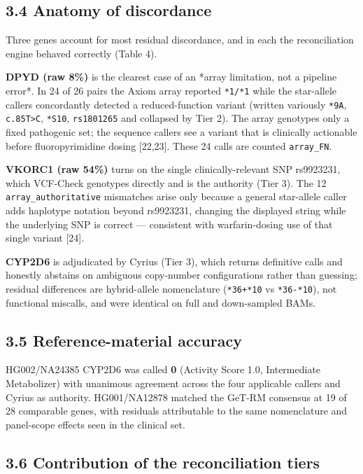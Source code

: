 \documentclass[11pt]{article}
\begin{document}
\subsection*{3.4 Anatomy of discordance}

Three genes account for most residual discordance, and in each the reconciliation engine behaved correctly (Table 4).

\textbf{DPYD (raw 8\%)} is the clearest case of an *array limitation, not a pipeline error*. In 24 of 26 pairs the Axiom array reported \texttt{*1/*1} while the star-allele callers concordantly detected a reduced-function variant (written variously \texttt{*9A}, \texttt{c.85T\textgreater{}C}, \texttt{*S10}, \texttt{rs1801265} and collapsed by Tier 2). The array genotypes only a fixed pathogenic set; the sequence callers see a variant that is clinically actionable before fluoropyrimidine dosing [22,23]. These 24 calls are counted \texttt{array\_FN}.

\textbf{VKORC1 (raw 54\%)} turns on the single clinically-relevant SNP rs9923231, which VCF-Check genotypes directly and is the authority (Tier 3). The 12 \texttt{array\_authoritative} mismatches arise only because a general star-allele caller adds haplotype notation beyond rs9923231, changing the displayed string while the underlying SNP is correct --- consistent with warfarin-dosing use of that single variant [24].

\textbf{CYP2D6} is adjudicated by Cyrius (Tier 3), which returns definitive calls and honestly abstains on ambiguous copy-number configurations rather than guessing; residual differences are hybrid-allele nomenclature (\texttt{*36+*10} vs \texttt{*36-*10}), not functional miscalls, and were identical on full and down-sampled BAMs.

\subsection*{3.5 Reference-material accuracy}

HG002/NA24385 CYP2D6 was called \textbf{ 0 } (Activity Score 1.0, Intermediate Metabolizer) with unanimous agreement across the four applicable callers and Cyrius as authority. HG001/NA12878 matched the GeT-RM consensus at 19 of 28 comparable genes, with residuals attributable to the same nomenclature and panel-scope effects seen in the clinical set.

\subsection*{3.6 Contribution of the reconciliation tiers}
\end{document}
